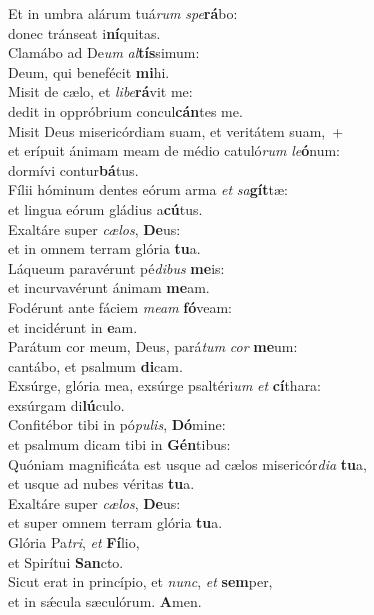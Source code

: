 \evenverse Et in umbra alárum tuá\textit{rum} \textit{spe}\textbf{rá}bo:~\*\\
\evenverse donec tránseat i\textbf{ní}quitas.\\
\oddverse Clamábo ad De\textit{um} \textit{al}\textbf{tís}simum:~\*\\
\oddverse Deum, qui benefécit \textbf{mi}hi.\\
\evenverse Misit de cælo, et \textit{li}\textit{be}\textbf{rá}vit me:~\*\\
\evenverse dedit in oppróbrium concul\textbf{cán}tes me.\\
\oddverse Misit Deus misericórdiam suam, et veritátem suam,~+\\
\oddverse  et erípuit ánimam meam de médio catuló\textit{rum} \textit{le}\textbf{ó}num:~\*\\
\oddverse dormívi contur\textbf{bá}tus.\\
\evenverse Fílii hóminum dentes eórum arma \textit{et} \textit{sa}\textbf{gít}tæ:~\*\\
\evenverse et lingua eórum gládius a\textbf{cú}tus.\\
\oddverse Exaltáre super \textit{cæ}\textit{los}, \textbf{De}us:~\*\\
\oddverse et in omnem terram glória \textbf{tu}a.\\
\evenverse Láqueum paravérunt pé\textit{di}\textit{bus} \textbf{me}is:~\*\\
\evenverse et incurvavérunt ánimam \textbf{me}am.\\
\oddverse Fodérunt ante fáciem \textit{me}\textit{am} \textbf{fó}veam:~\*\\
\oddverse et incidérunt in \textbf{e}am.\\
\evenverse Parátum cor meum, Deus, pará\textit{tum} \textit{cor} \textbf{me}um:~\*\\
\evenverse cantábo, et psalmum \textbf{di}cam.\\
\oddverse Exsúrge, glória mea, exsúrge psaltéri\textit{um} \textit{et} \textbf{cí}thara:~\*\\
\oddverse exsúrgam di\textbf{lú}culo.\\
\evenverse Confitébor tibi in pó\textit{pu}\textit{lis}, \textbf{Dó}mine:~\*\\
\evenverse et psalmum dicam tibi in \textbf{Gén}tibus:\\
\oddverse Quóniam magnificáta est usque ad cælos misericór\textit{di}\textit{a} \textbf{tu}a,~\*\\
\oddverse et usque ad nubes véritas \textbf{tu}a.\\
\evenverse Exaltáre super \textit{cæ}\textit{los}, \textbf{De}us:~\*\\
\evenverse et super omnem terram glória \textbf{tu}a.\\
\oddverse Glória Pa\textit{tri}, \textit{et} \textbf{Fí}lio,~\*\\
\oddverse et Spirítui \textbf{San}cto.\\
\evenverse Sicut erat in princípio, et \textit{nunc}, \textit{et} \textbf{sem}per,~\*\\
\evenverse et in sǽcula sæculórum. \textbf{A}men.\\
